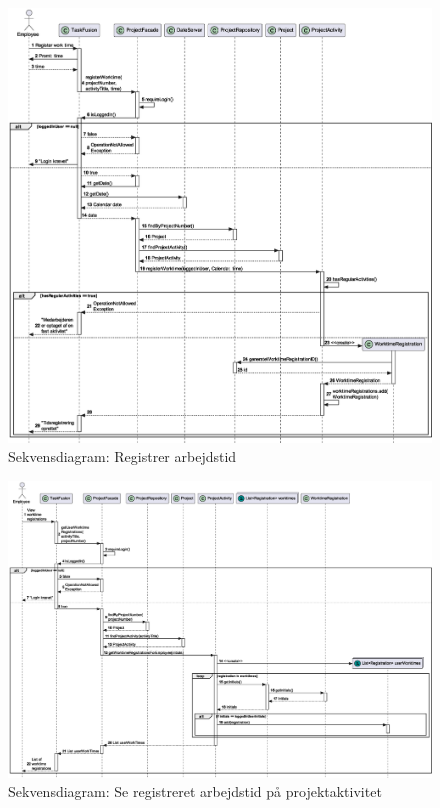 \begin{figure}[H]
    \centering
    \caption{Sekvensdiagram: Registrer arbejdstid}\label{fig:sequenceRegisterWorktime}
    \includegraphics[width=\textwidth]{RequirementsAndDesign/SequenceDiagrams/seqRegisterWorktime.eps}
\end{figure}
\begin{figure}[H]
    \centering
    \caption{Sekvensdiagram: Se registreret arbejdstid på projektaktivitet}\label{fig:sequenceViewWorktime}
    \includegraphics[width=\textwidth]{RequirementsAndDesign/SequenceDiagrams/seqViewWorktime.eps}
\end{figure}
